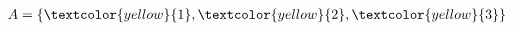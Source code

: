 \documentclass[preview]{standalone}
\begin{document}
\begin{align*}
A = \{ \textcolor{yellow}{1}, \textcolor{yellow}{2}, \textcolor{yellow}{3} \}
\end{align*}
\end{document}
